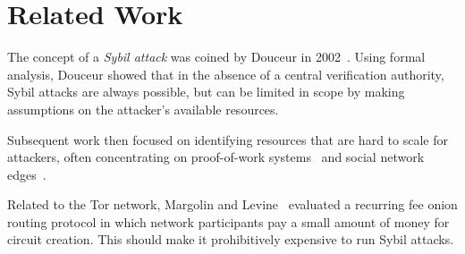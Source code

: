 \section{Related Work}
\label{sec:related_work}
The concept of a \emph{Sybil attack} was coined by Douceur in
2002~\cite{Douceur2002a}.  Using formal analysis, Douceur showed that in the
absence of a central verification authority, Sybil attacks are always possible,
but can be limited in scope by making assumptions on the attacker's available
resources.

Subsequent work then focused on identifying resources that are hard to scale for
attackers, often concentrating on proof-of-work
systems~\cite{Li2012a,Borisov2006a} and social network
edges~\cite{Danezis2009a,Yu2006a}.

\cite{Wolchok2010a}

Related to the Tor network, Margolin and Levine~\cite{Margolin2008a} evaluated
a recurring fee onion routing protocol in which network participants pay a
small amount of money for circuit creation.  This should make it prohibitively
expensive to run Sybil attacks.
